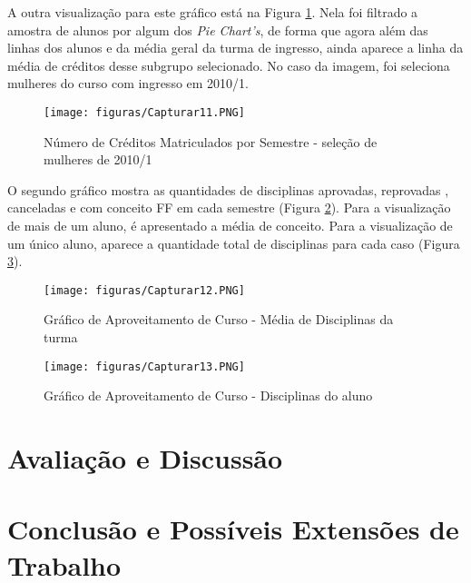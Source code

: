 \documentclass[cic,tc]{iiufrgs}
\begin{document}
A outra visualização para este gráfico está na Figura \ref{fig:numCredMulher2010}. Nela foi filtrado a amostra de alunos por algum dos \textit{Pie Chart's}, de forma que agora além das linhas dos alunos e da média geral da turma de ingresso, ainda aparece a linha da média de créditos desse subgrupo selecionado. No caso da imagem, foi seleciona mulheres do curso com ingresso em 2010/1.


\begin{figure} [!ht]
        \caption{Número de Créditos Matriculados por Semestre - seleção de mulheres de 2010/1}
        \begin{center}
            \texttt{[image: figuras/Capturar11.PNG]}
        \end{center}
        
        \label{fig:numCredMulher2010}
    \end{figure}


O segundo gráfico mostra as quantidades de disciplinas aprovadas, reprovadas , canceladas e com conceito FF em cada semestre (Figura \ref{fig:graphAprovMedio}). Para a visualização de mais de um aluno, é apresentado a média de conceito. Para a visualização de um único aluno, aparece a quantidade total de disciplinas para cada caso (Figura \ref{fig:graphAprovAluno}).

\begin{figure} [!ht]
        \caption{Gráfico de Aproveitamento de Curso - Média de Disciplinas da turma}
        \begin{center}
            \texttt{[image: figuras/Capturar12.PNG]}
        \end{center}
        
        \label{fig:graphAprovMedio}
    \end{figure}

\begin{figure} [!ht]
        \caption{Gráfico de Aproveitamento de Curso - Disciplinas do aluno}
        \begin{center}
            \texttt{[image: figuras/Capturar13.PNG]}
        \end{center}
        
        \label{fig:graphAprovAluno}
    \end{figure}



\chapter{Avaliação e Discussão}  
\chapter{Conclusão e Possíveis Extensões de Trabalho}



\end{document}
